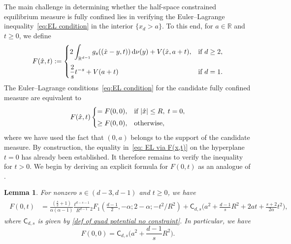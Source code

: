 \documentclass{amsart}
\def\R{\mathbb{R}}
\newcommand{\ud}{\, \mathrm{d}}
\theoremstyle{plain}
\newtheorem{lem}[thm]{Lemma}
\theoremstyle{remark}
\numberwithin{equation}{section}
\begin{document}
The main challenge in determining whether the half-space constrained
equilibrium measure is fully confined lies in verifying the
Euler--Lagrange inequality~\eqref{eq:EL condition} in the interior
$\{x_d>a\}$. To this end, for $a\in\R$ and $t\ge0$, we define 
\begin{align} \label{eq: def F(x,t)}
    F(\hat{x},t) := \begin{dcases}
        2\int_{\R^{d-1}} g_s((\hat{x}-y, t)) \ud\nu(y)+V(\hat{x},a+t), & \text{if } d\geq 2,
        \smallskip 
        \\
        \frac{2}{s} t^{-s} + V(a+t) &\text{if } d = 1.
    \end{dcases}
\end{align}
The Euler--Lagrange conditions~\eqref{eq:EL condition} for the candidate
fully confined measure are equivalent to 
\begin{equation} \label{eq: EL via F(x,t)}
    F(\hat x,t) 
    \begin{cases}
        = F(0,0), &\textup{if } |\hat x|\le R, \;t=0,
        \smallskip 
        \\
        \ge F(0,0), &\text{otherwise},
    \end{cases}
\end{equation}
where we have used the fact that $(0,a)$ belongs to the support of the
candidate measure. By construction, the equality in~\eqref{eq: EL via F(x,t)}
on the hyperplane $t=0$ has already been established. It therefore remains
to verify the inequality for $t>0$. We begin by deriving an explicit
formula for $F(0,t)$ as an analogue of \cite[Lemma 4.1]{BFMS26}.
 

\begin{lem}\label{lem:F(0,t)}
For nonzero $s\in(d-3,d-1)$ and $t\ge0$, we have
\begin{align}\label{eq:F(0,t)}
\begin{split}
    F(0,t) &=\frac{(\frac{s}{2}+1)}{\alpha(\alpha-1)} \frac{t^{d-s-1}}{R^{d-1}} {}_2F_1 (\tfrac{d-1}{2},-\alpha; 2-\alpha ;-t^2/R^2) + \mathsf{C}_{d,s}\Big(a^2 + \frac{d-1}{s}R^2  + 2at + \frac{s+2}{2\alpha}t^2\Big),
\end{split}
\end{align}
where $\mathsf{C}_{d,s}$ is given by \eqref{def of quad potential no constraint}. 
In particular, we have
\begin{equation}\label{eq:F(0,0)}
    F(0,0)=\mathsf{C}_{d,s}  \Big(a^2+\frac{d-1}{s}R^2\Big). 
\end{equation}
\end{lem}
\end{document}
